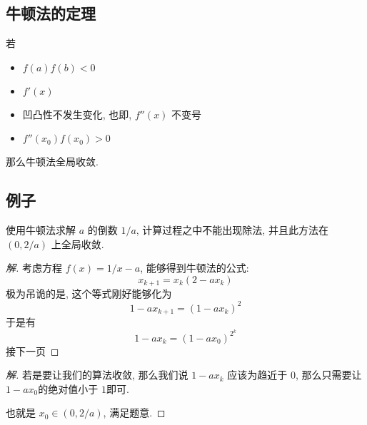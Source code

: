 \subsection{牛顿法的定理}

\begin{frame}
\begin{thm}
若
	\begin{itemize}
	\item \(f (a ) f(b) < 0\)
	\item \(f '(x) \)
	\item 凹凸性不发生变化, 也即, \(f ''(x)\) 不变号
	\item \(f ''(x_{0}) f (x _{0}) > 0\)
	\end{itemize}
	那么牛顿法全局收敛.
\end{thm}
\end{frame}

\subsection{例子}
\begin{frame}
使用牛顿法求解 \(a\) 的倒数 \(1/a\), 计算过程之中不能出现除法, 并且此方法在 \((0, 2/a)\) 上全局收敛.
\begin{proof}[解]
考虑方程 \(f (x) = 1/x - a\), 能够得到牛顿法的公式:
\[
x_{k+1} = x_{k} (2 -  a x_{k})
\]
极为吊诡的是, 这个等式刚好能够化为
\[
1 - a x_{k+1} = (1 - a x_{k})^{2} 
\]
于是有
\[
1- a x_{k} = (1-  ax_{0}) ^{2 ^{k}}
\]接下一页
\end{proof}
\end{frame}

\begin{frame}
\begin{proof}[解]
若是要让我们的算法收敛, 那么我们说 \(1 - a x _{k}\) 应该为趋近于 \(0\), 那么只需要让 \( 1 - a x _{0}\)的绝对值小于 \(1\)即可.

\bigskip
也就是 \(x _{0} \in (0 , 2/a)\), 满足题意.
\end{proof}
\end{frame}
